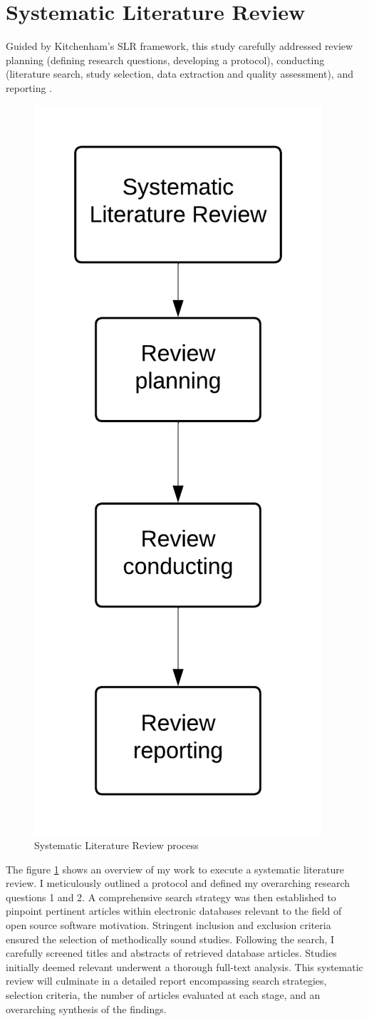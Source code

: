 \section{Systematic Literature Review}

Guided by Kitchenham's SLR framework, this study carefully addressed review planning (defining research questions, developing a protocol), conducting (literature search, study selection, data extraction and quality assessment), and reporting \cite{Kitchenham}.

\begin{figure}[ht]
    \centering
    \includegraphics[width=0.3\linewidth]{figs/slr-overview.png}
    \caption{Systematic Literature Review process \cite{Kitchenham}}
    \label{fig:slr-overview}
\end{figure}

The figure \ref{fig:slr-overview} shows an overview of my work to execute a systematic literature review. I meticulously outlined a protocol and defined my overarching research questions 1 and 2. A comprehensive search strategy was then established to pinpoint pertinent articles within electronic databases relevant to the field of open source software motivation. Stringent inclusion and exclusion criteria ensured the selection of methodically sound studies. Following the search, I carefully screened titles and abstracts of retrieved database articles. Studies initially deemed relevant underwent a thorough full-text analysis. This systematic review will culminate in a detailed report encompassing search strategies, selection criteria, the number of articles evaluated at each stage, and an overarching synthesis of the findings.



